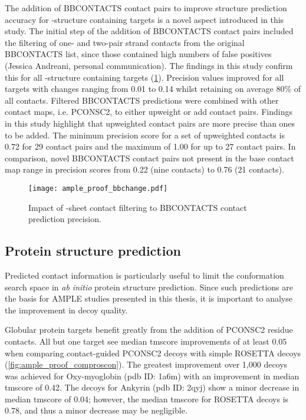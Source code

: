 The addition of BBCONTACTS contact pairs to improve structure prediction accuracy for \textbeta-structure containing targets is a novel aspect introduced in this study. The initial step of the addition of BBCONTACTS contact pairs included the filtering of one- and two-pair strand contacts from the original BBCONTACTS list, since those contained high numbers of false positives (Jessica Andreani, personal communication). The findings in this study confirm this for all \textbeta-structure containing targets (\cref{fig:ample_proof_bbchange}). Precision values improved for all targets with changes ranging from 0.01 to 0.14 whilst retaining on average 80\% of all contacts. Filtered BBCONTACTS predictions were combined with other contact maps, i.e. PCONSC2, to either upweight or add contact pairs. Findings in this study highlight that upweighted contact pairs are more precise than ones to be added. The minimum precision score for a set of upweighted contacts is 0.72 for 29 contact pairs and the maximum of 1.00 for up to 27 contact pairs. In comparison, novel BBCONTACTS contact pairs not present in the base contact map range in precision scores from 0.22 (nine contacts) to 0.76 (21 contacts). 

\begin{figure}[H]
    \centering
    \texttt{[image: ample\_proof\_bbchange.pdf]}
    \caption[Impact of contact filtering to BBCONTACTS contact prediction]{Impact of \textbeta-sheet contact filtering to BBCONTACTS contact prediction precision.}
    \label{fig:ample_proof_bbchange}
\end{figure}

\subsection{Protein structure prediction}

Predicted contact information is particularly useful to limit the conformation search space in \textit{ab initio} protein structure prediction. Since such predictions are the basis for AMPLE studies presented in this thesis, it is important to analyse the improvement in decoy quality.

Globular protein targets benefit greatly from the addition of PCONSC2 residue contacts. All but one target see median \gls{tmscore} improvements of at least 0.05 when comparing contact-guided PCONSC2 decoys with simple ROSETTA decoys (\cref{fig:ample_proof_comproscon}). The greatest improvement over 1,000 decoys was achieved for Oxy-myoglobin (\gls{pdb} ID: 1a6m) with an improvement in median \gls{tmscore} of 0.42.  The decoys for Ankyrin (\gls{pdb} ID: 2qyj) show a minor decrease in median \gls{tmscore} of 0.04; however, the median \gls{tmscore} for ROSETTA decoys is 0.78, and thus a minor decrease may be negligible. 

